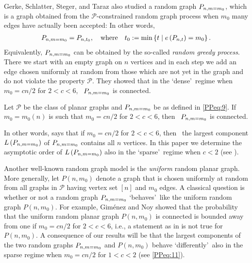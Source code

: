 Gerke, Schlatter, Steger, and Taraz also studied a random graph $P_{n,m=m_0}$, which is a graph obtained from the $\mathcal{P}$-constrained random graph process when $m_0$ many edges have actually been accepted: In other words,
\begin{align}\label{PPeq:9}
	P_{n,m=m_0}=P_{n,t_0}, \quad \text{where}\quad t_0:=\min\left\{t \mid e\left({P_{n,t}}\right)=m_0\right\}.
\end{align}
Equivalently, $P_{n,m=m_0}$ can be obtained by the so-called \textit{random greedy process}. There we start with an empty graph on $n$ vertices and in each step we add an edge chosen uniformly at random from those which are not yet in the graph and do not violate the property $\mathcal{P}$. They showed that in the \lq dense\rq\ regime when $m_0=cn/2$ for $2<c<6$, \whp\ $P_{n,m=m_0}$ is connected.

\begin{thm}\label{PPthm:connected}
Let $\mathcal{P}$ be the class of planar graphs and $P_{n,m=m_0}$ be as defined in \eqref{PPeq:9}.
If $m_0=m_0(n)$ is such that $m_0=cn/2$ for $2<c<6$, then \whp\ $P_{n,m=m_0}$ is connected.
\end{thm}

In other words,  says that if $m_0=cn/2$ for $2<c<6$, then \whp\ the largest component $L\left(P_{n,m=m_0}\right)$ of $P_{n,m=m_0}$ contains all $n$ vertices. In this paper we determine the asymptotic order of $L\left(P_{n,m=m_0}\right)$ also in the \lq sparse\rq\ regime when $c<2$ (see ).

Another well-known random graph model is the {\em uniform} random planar graph. More generally, let $P(n,m_0)$ denote a graph that is chosen uniformly at random from all graphs in $\mathcal{P}$ having vertex set $[n]$ and $m_0$ edges. A classical question is whether or not a random graph $P_{n,m=m_0}$ \lq behaves\rq\ like the uniform random graph $P(n,m_0)$. For example, Gim\'{e}nez and Noy \cite{GimenezNoy2009} showed that the probability that the uniform random planar graph $P(n,m_0)$ is connected is bounded away from one if $m_0=cn/2$ for $2<c<6$, i.e., a statement as in  is not true for $P(n,m_0)$. A consequence of our results will be that the largest components of the two random graphs $P_{n,m=m_0}$ and $P(n,m_0)$ behave \lq differently\rq\ also in the sparse regime when $m_0=cn/2$ for $1<c<2$ (see \eqref{PPeq:11}).

